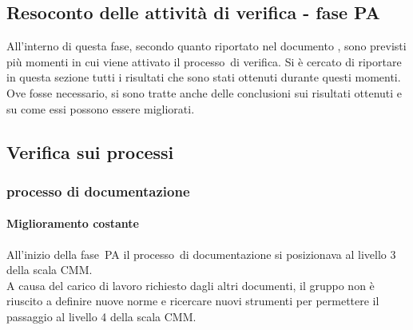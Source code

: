 \documentclass[../PianoDiQualifica.tex]{subfiles}
\begin{document}
\begin{appendices}
\section{Resoconto delle attività di verifica - fase PA}
All'interno di questa fase\g, secondo quanto riportato nel documento \pianodiprogetto, sono previsti più momenti in cui viene attivato il processo\g\ di verifica. Si è cercato di riportare in questa sezione tutti i risultati che sono stati ottenuti durante questi momenti. Ove fosse necessario, si sono tratte anche delle conclusioni sui risultati ottenuti e su come essi possono essere migliorati.
	
	\subsection{Verifica sui processi}
		\subsubsection{processo di documentazione}
			\paragraph{Miglioramento costante}
			All'inizio della fase\g\ PA il processo\g\ di documentazione si posizionava al livello 3 della scala CMM\g.\\
			A causa del carico di lavoro richiesto dagli altri documenti, il gruppo non è riuscito a definire nuove norme e ricercare nuovi strumenti per permettere il passaggio al livello 4 della scala CMM\g.
			

\end{appendices}
\end{document}
